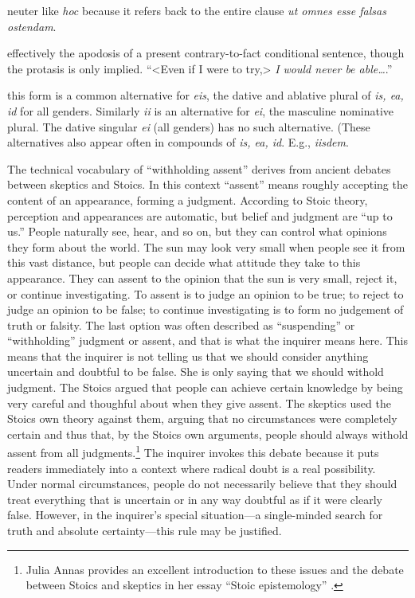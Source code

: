  neuter like \textit{hoc} because it refers back to the entire clause \textit{ut omnes esse falsas ostendam}.

 effectively the apodosis of a present contrary-to-fact conditional sentence, though the protasis is only implied. ``<Even if I were to try,> \textit{I would never be able\dots}.''

 this form is a common alternative for \textit{eis}, the dative and ablative plural of \textit{is, ea, id} for all genders. Similarly \textit{ii} is an alternative for \textit{ei}, the masculine nominative plural. The dative singular \textit{ei} (all genders) has no such alternative. (These alternatives also appear often in compounds of \textit{is, ea, id}. E.g., \textit{iisdem}.

 The technical vocabulary of ``withholding assent'' derives from ancient debates between skeptics and Stoics. In this context ``assent'' means roughly accepting the content of an appearance, forming a judgment. According to Stoic theory, perception and appearances are automatic, but belief and judgment are ``up to us.'' People naturally see, hear, and so on, but they can control what opinions they form about the world. The sun may look very small when people see it from this vast distance, but people can decide what attitude they take to this appearance. They can assent to the opinion that the sun is very small, reject it, or continue investigating. To assent is to judge an opinion to be true; to reject to judge an opinion to be false; to continue investigating is to form no judgement of truth or falsity. The last option was often described as ``suspending'' or ``withholding'' judgment or assent, and that is what the inquirer means here. This means that the inquirer is not telling us that we should consider anything uncertain and doubtful to be false. She is only saying that we should withold judgment. The Stoics argued that people can achieve certain knowledge by being very careful and thoughful about when they give assent. The skeptics used the Stoics own theory against them, arguing that no circumstances were completely certain and thus that, by the Stoics own arguments, people should always withold assent from all judgments.\footnote{Julia Annas provides an excellent introduction to these issues and the debate between Stoics and skeptics in her essay ``Stoic epistemology'' \parencite{annas1990}.} The inquirer invokes this debate because it puts readers immediately into a context where radical doubt is a real possibility. Under normal circumstances, people do not necessarily believe that they should treat everything that is uncertain or in any way doubtful as if it were clearly false. However, in the inquirer's special situation---a single-minded search for truth and absolute certainty---this rule may be justified.

